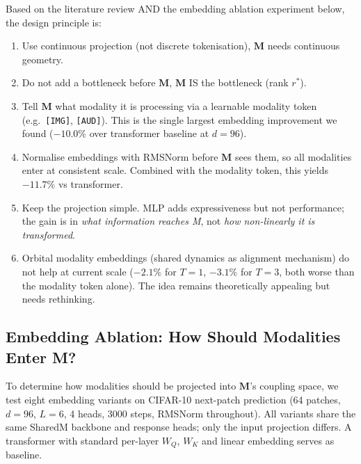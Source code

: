 \documentclass[11pt, a4paper]{article}
\newcommand{\M}{\mathbf{M}}
\theoremstyle{plain}
\theoremstyle{remark}
\begin{document}
Based on the literature review AND the embedding ablation experiment below, the design principle is:
\begin{enumerate}[nosep]
    \item Use continuous projection (not discrete tokenisation), $\M$ needs continuous geometry.
    \item Do not add a bottleneck before $\M$, $\M$ IS the bottleneck (rank $r^*$).
    \item Tell $\M$ what modality it is processing via a learnable modality token (e.g.\ \texttt{[IMG]}, \texttt{[AUD]}).  This is the single largest embedding improvement we found ($-10.0\%$ over transformer baseline at $d{=}96$).
    \item Normalise embeddings with RMSNorm before $\M$ sees them, so all modalities enter at consistent scale.  Combined with the modality token, this yields $-11.7\%$ vs transformer.
    \item Keep the projection simple.  MLP adds expressiveness but not performance; the gain is in \emph{what information reaches M}, not \emph{how non-linearly it is transformed}.
    \item Orbital modality embeddings (shared dynamics as alignment mechanism) do not help at current scale ($-2.1\%$ for $T{=}1$, $-3.1\%$ for $T{=}3$, both worse than the modality token alone).  The idea remains theoretically appealing but needs rethinking.
\end{enumerate}

\subsection{Embedding Ablation: How Should Modalities Enter M?}\label{sec:embedding-ablation}

To determine how modalities should be projected into $\M$'s coupling space, we test eight embedding variants on CIFAR-10 next-patch prediction (64 patches, $d{=}96$, $L{=}6$, 4 heads, 3000 steps, RMSNorm throughout).  All variants share the same SharedM backbone and response heads; only the input projection differs.  A transformer with standard per-layer $W_Q$, $W_K$ and linear embedding serves as baseline.
\end{document}
